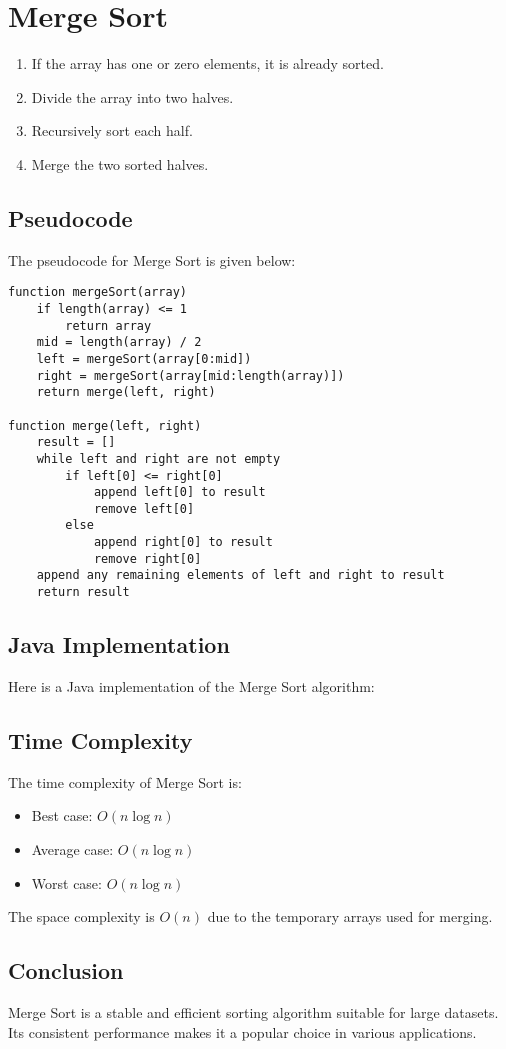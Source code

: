 \chapter{Merge Sort}


\begin{enumerate}
    \item If the array has one or zero elements, it is already sorted.
    \item Divide the array into two halves.
    \item Recursively sort each half.
    \item Merge the two sorted halves.
\end{enumerate}

\section{Pseudocode}
The pseudocode for Merge Sort is given below:

\begin{verbatim}
function mergeSort(array)
    if length(array) <= 1
        return array
    mid = length(array) / 2
    left = mergeSort(array[0:mid])
    right = mergeSort(array[mid:length(array)])
    return merge(left, right)

function merge(left, right)
    result = []
    while left and right are not empty
        if left[0] <= right[0]
            append left[0] to result
            remove left[0]
        else
            append right[0] to result
            remove right[0]
    append any remaining elements of left and right to result
    return result
\end{verbatim}

\section{Java Implementation}
Here is a Java implementation of the Merge Sort algorithm:

% 

\section{Time Complexity}
The time complexity of Merge Sort is:
\begin{itemize}
    \item Best case: $O(n \log n)$
    \item Average case: $O(n \log n)$
    \item Worst case: $O(n \log n)$
\end{itemize}

The space complexity is $O(n)$ due to the temporary arrays used for merging.

\section{Conclusion}
Merge Sort is a stable and efficient sorting algorithm suitable for large datasets. Its consistent performance makes it a popular choice in various applications.
